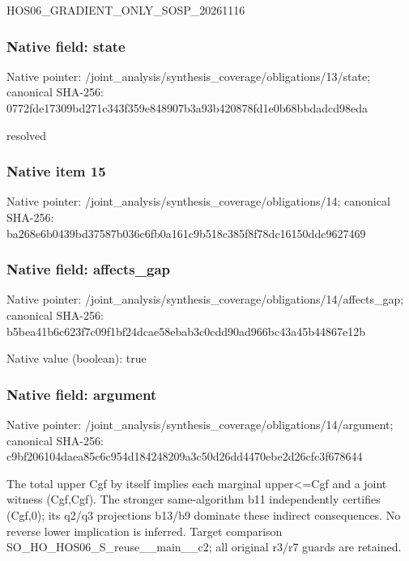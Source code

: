 \documentclass[10pt,a4paper]{article}
\begin{document}
\begingroup\raggedright\sloppy HOS06\_\allowbreak{}GRADIENT\_\allowbreak{}ONLY\_\allowbreak{}SOSP\_\allowbreak{}20261116\par\endgroup

\subsubsection{Native field: state}
Native pointer: /joint\_\allowbreak{}analysis/synthesis\_\allowbreak{}coverage/obligations/13/state; canonical SHA-256: 0772fde17309bd271c343f359e848907b3a93b420878fd1e0b68bbdadcd98eda

\begingroup\raggedright\sloppy resolved\par\endgroup

\subsubsection{Native item 15}
Native pointer: /joint\_\allowbreak{}analysis/synthesis\_\allowbreak{}coverage/obligations/14; canonical SHA-256: ba268e6b0439bd37587b036c6fb0a161c9b518c385f8f78dc16150ddc9627469

\subsubsection{Native field: affects\_\allowbreak{}gap}
Native pointer: /joint\_\allowbreak{}analysis/synthesis\_\allowbreak{}coverage/obligations/14/affects\_\allowbreak{}gap; canonical SHA-256: b5bea41b6c623f7c09f1bf24dcae58ebab3c0cdd90ad966bc43a45b44867e12b

Native value (boolean): true

\subsubsection{Native field: argument}
Native pointer: /joint\_\allowbreak{}analysis/synthesis\_\allowbreak{}coverage/obligations/14/argument; canonical SHA-256: c9bf206104daea85c6c954d184248209a3c50d26dd4470ebe2d26cfc3f678644

\begingroup\raggedright\sloppy The total upper Cgf by itself implies each marginal upper<=\allowbreak{}Cgf and a joint witness (Cgf,\allowbreak{}Cgf). The stronger same-algorithm b11 independently certifies (Cgf,\allowbreak{}0);\allowbreak{} its q2/\allowbreak{}q3 projections b13/\allowbreak{}b9 dominate these indirect consequences. No reverse lower implication is inferred. Target comparison SO\_\allowbreak{}HO\_\allowbreak{}HOS06\_\allowbreak{}S\_\allowbreak{}reuse\_\allowbreak{}\_\allowbreak{}main\_\allowbreak{}\_\allowbreak{}c2;\allowbreak{} all original r3/\allowbreak{}r7 guards are retained.\par\endgroup
\end{document}
